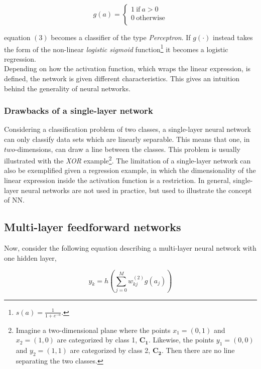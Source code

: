 \documentclass[12pt, letterpaper]{amsart}%
\begin{document}
\begin{equation}
g(a) = 
     \begin{cases}
       1 \ \text{if} \ a > 0 \\
       0 \ \text{otherwise} \\ 
     \end{cases}
\end{equation}

equation $(3)$ becomes a classifier of the type \textit{Perceptron}. If $g(\cdot)$ instead takes the form of the non-linear \textit{logistic sigmoid} function\footnote{$s(a) = \frac{1}{1+e^{-a}}$.} it becomes a logistic regression.
\\

Depending on how the activation function, which wraps the linear expression, is defined, the network is given different characteristics. This gives an intuition behind the generality of neural networks.

\subsubsection{Drawbacks of a single-layer network}
Considering a classification problem of two classes, a single-layer neural network can only classify data sets which are linearly separable. This means that one, in $two$-dimensions, can draw a line between the classes. This problem is usually illustrated with the \textit{XOR} example\footnote{Imagine a two-dimensional plane where the points $x_1 = (0,1)$ and $x_2 = (1,0)$ are categorized by class 1, $\mathbf{C_1}$. Likewise, the points $y_1=(0,0)$ and $y_2=(1,1)$ are categorized by class 2, $\mathbf{C_2}$. Then there are no line separating the two classes.}. The limitation of a single-layer network can also be exemplified given a regression example, in which the dimensionality of the linear expression inside the activation function is a restriction. In general, single-layer neural networks are not used in practice, but used to illustrate the concept of NN. 


\subsection{Multi-layer feedforward networks}
Now, consider the following equation describing a multi-layer neural network with one hidden layer,

\begin{equation}
y_k = h \left( \sum_{j=0}^M w_{kj}^{(2)} g \left( a_j \right) \right)
\end{equation}
\end{document}
